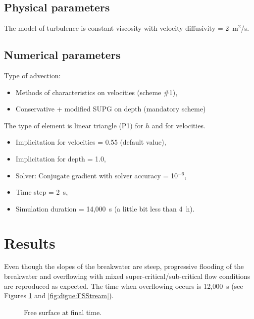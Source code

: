 
\subsection{Physical parameters}

The model of turbulence is constant viscosity
with velocity diffusivity = 2~m$^2$/s.

\subsection{Numerical parameters}
Type of advection:
\begin{itemize}
\item Methods of characteristics on velocities (scheme \#1),
\item Conservative + modified SUPG on depth (mandatory scheme)
\end{itemize}

The type of element is linear triangle (P1) for $h$ and for velocities.

\begin{itemize}
\item Implicitation for velocities = 0.55 (default value),
\item Implicitation for depth = 1.0,
\item Solver: Conjugate gradient with solver accuracy = 10$^{-6}$,
\item Time step = 2~s,
\item Simulation duration = 14,000~s (a little bit less than 4~h).
\end{itemize}

\section{Results}
Even though the slopes of the breakwater are steep,
progressive flooding of the breakwater and overflowing
with mixed super-critical/sub-critical flow conditions are reproduced as expected.
The time when overflowing occurs is 12,000~s
(see Figures \ref{fig:digue:FreeSurface} and \ref{fig:digue:FSStream}).

\begin{figure}[H]
 \centering
  \caption{Free surface at final time.}\label{fig:digue:FreeSurface}
\end{figure}

